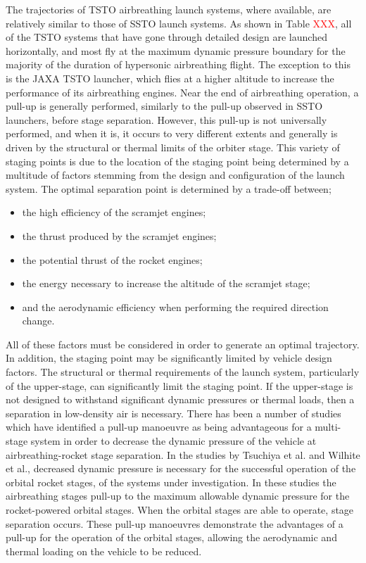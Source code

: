 The trajectories of TSTO airbreathing launch systems, where available, are relatively similar to those of SSTO launch systems. As shown in Table \textcolor{red}{XXX}, all of the TSTO systems that have gone through detailed design are launched horizontally, and most fly at the maximum dynamic pressure boundary for the majority of the duration of hypersonic airbreathing flight. The exception to this is the JAXA TSTO launcher, which flies at a higher altitude to increase the performance of its airbreathing engines. Near the end of airbreathing operation, a pull-up is generally performed, similarly to the pull-up observed in SSTO launchers, before stage separation. However, this pull-up is not universally performed, and when it is, it occurs to very different extents and generally is driven by the structural or thermal limits of the orbiter stage. 
This variety of staging points is due to the location of the staging point being determined by a multitude of factors stemming from the design and configuration of the launch system. The optimal separation point is determined by a trade-off between;
\begin{itemize}
	\item the high efficiency of the scramjet engines;
	\item the thrust produced by the scramjet engines;
	\item the potential thrust of the rocket engines;
	\item the energy necessary to increase the altitude of the scramjet stage;
	\item and the aerodynamic efficiency when performing the required direction change.
\end{itemize}
All of these factors must be considered in order to generate an optimal trajectory. In addition, the staging point may be significantly limited by vehicle design factors. 
The structural or thermal requirements of the launch system, particularly of the upper-stage, can significantly limit the staging point. If the upper-stage is not designed to withstand significant dynamic pressures or thermal loads, then a separation in low-density air is necessary. 
There has been a number of studies which have identified a pull-up manoeuvre as being advantageous for a multi-stage system in order to decrease the dynamic pressure of the vehicle at airbreathing-rocket stage separation\cite{Tsuchiya2005,Wilhite1991,Mehta2001}. 
In the studies by Tsuchiya et al.\cite{Tsuchiya2005} and Wilhite et al.\cite{Wilhite1991}, decreased dynamic pressure is necessary for the successful operation of the orbital rocket stages, of the systems under investigation. In these studies the airbreathing stages pull-up to the maximum allowable dynamic pressure for the rocket-powered orbital stages. When the orbital stages are able to operate, stage separation occurs. These pull-up manoeuvres demonstrate the advantages of a pull-up for the operation of the orbital stages, allowing the aerodynamic and thermal loading on the vehicle to be reduced. 
